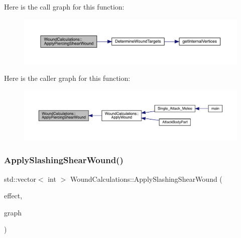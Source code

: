 Here is the call graph for this function\+:
\nopagebreak
\begin{figure}[H]
\begin{center}
\leavevmode
\includegraphics[width=350pt]{class_wound_calculations_ac763bba5d770b968ab68532b974d878d_cgraph}
\end{center}
\end{figure}
Here is the caller graph for this function\+:
\nopagebreak
\begin{figure}[H]
\begin{center}
\leavevmode
\includegraphics[width=350pt]{class_wound_calculations_ac763bba5d770b968ab68532b974d878d_icgraph}
\end{center}
\end{figure}
\mbox{\label{class_wound_calculations_ae0e649e97591c6a6b28d6a4ff7e0324e}} 
\subsubsection{\texorpdfstring{Apply\+Slashing\+Shear\+Wound()}{ApplySlashingShearWound()}}
{\footnotesize\ttfamily std\+::vector$<$ int $>$ Wound\+Calculations\+::\+Apply\+Slashing\+Shear\+Wound (\begin{DoxyParamCaption}\item[{\mbox{\hyperlink{struct_applied_force_effect}{Applied\+Force\+Effect}} \&}]{effect,  }\item[{\mbox{\hyperlink{_body_graph_8hpp_ab01b157c2e143191570b012d275fbf0d}{Anatomy\+Graph}} \&}]{graph }\end{DoxyParamCaption})}

